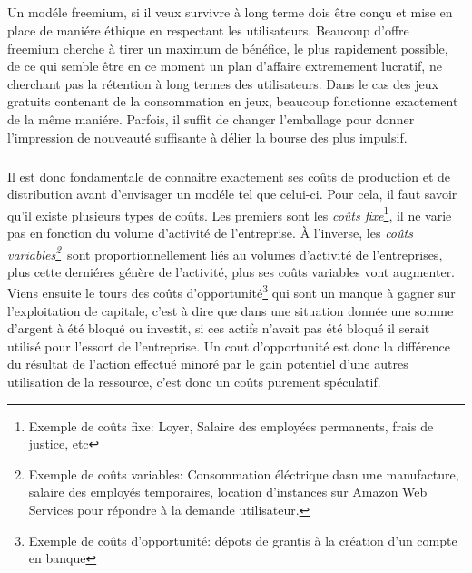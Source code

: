 \documentclass[11pt, a4paper ]{article}
\begin{document}
\begin{spacing}{1.5}
\subparagraph{}
Un modéle freemium, si il veux survivre à long terme dois être conçu et mise en place de maniére éthique\cite{ethicalF2P} en respectant les utilisateurs. Beaucoup d'offre freemium cherche à tirer un maximum de bénéfice, le plus rapidement possible, de ce qui semble être en ce moment un plan d'affaire extremement lucratif, ne cherchant pas la rétention à long termes des utilisateurs. Dans le cas des jeux gratuits contenant de la consommation en jeux, beaucoup fonctionne exactement de la même maniére. Parfois, il suffit de changer l'emballage pour donner l'impression de nouveauté suffisante à délier la bourse des plus impulsif.
\subparagraph{}
Il est donc fondamentale de connaitre exactement ses coûts de production et de distribution avant d'envisager un modéle tel que celui-ci. Pour cela, il faut savoir qu'il existe plusieurs types de coûts.
Les premiers sont les \emph{coûts fixe}\footnote{Exemple de coûts fixe: Loyer, Salaire des employées permanents, frais de justice, etc}\cite{defCoutFixeEtVar}, il ne varie pas en fonction du volume d'activité de l'entreprise.
À l'inverse, les \emph{coûts variables\footnote{Exemple de coûts variables: Consommation éléctrique dasn une manufacture, salaire des employés temporaires, location d'instances sur Amazon Web Services pour répondre à la demande utilisateur.}\cite{defCoutFixeEtVar}}\ sont proportionnellement liés au volumes d'activité de l'entreprises, plus cette derniéres génère de l'activité, plus ses coûts variables vont augmenter.
Viens ensuite le tours des coûts d'opportunité\footnote{Exemple de coûts d'opportunité: dépots de grantis à la création d'un compte en banque }\cite{defCoutOpp} qui sont un manque à gagner sur l'exploitation de capitale, c'est à dire que dans une situation donnée une somme d'argent à été bloqué ou investit, si ces actifs n'avait pas été bloqué il serait utilisé pour l'essort de l'entreprise. Un cout d'opportunité est donc la différence du résultat de l'action effectué minoré par le gain potentiel d'une autres utilisation de la ressource, c'est donc un coûts purement spéculatif.

\end{spacing}
\end{document}

